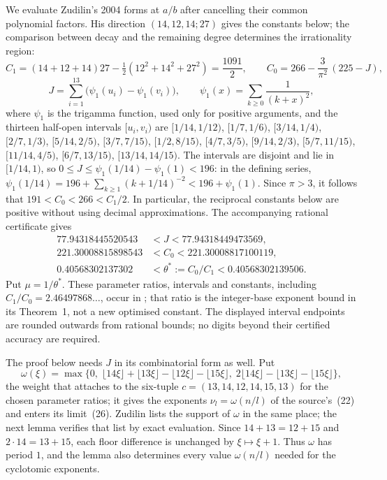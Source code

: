 We evaluate Zudilin's 2004 forms at $a/b$ after cancelling their
common polynomial factors. His direction $(14,12,14;27)$
\cite[Sec.~5, pp.~161--162]{zudilin2004} gives the constants below;
the comparison between decay and the remaining degree determines
the irrationality region:
\[
 C_1=(14+12+14)27-\tfrac12(12^2+14^2+27^2)=\frac{1091}{2},
 \qquad
 C_0=266-\frac{3}{\pi^{2}}\,(225-J),
\]
\[
 J=\sum_{i=1}^{13}\bigl(\psi_1(u_i)-\psi_1(v_i)\bigr),
 \qquad
 \psi_1(x)=\sum_{k\ge0}\frac1{(k+x)^{2}},
\]
where $\psi_1$ is the trigamma function, used only for positive arguments,
and the thirteen half-open intervals $[u_i,v_i)$ are
$[1/14,1/12)$, $[1/7,1/6)$, $[3/14,1/4)$, $[2/7,1/3)$, $[5/14,2/5)$,
$[3/7,7/15)$, $[1/2,8/15)$, $[4/7,3/5)$, $[9/14,2/3)$, $[5/7,11/15)$,
$[11/14,4/5)$, $[6/7,13/15)$, $[13/14,14/15)$.
The intervals are disjoint and lie in $[1/14,1)$, so
$0\le J\le\psi_1(1/14)-\psi_1(1)<196$: in the defining series,
$\psi_1(1/14)=196+\sum_{k\ge1}(k+1/14)^{-2}<196+\psi_1(1)$.
Since $\pi>3$, it follows that $191<C_0<266<C_1/2$.
In particular, the reciprocal constants below are positive without
using decimal approximations. The accompanying rational certificate gives
\[
\begin{aligned}
77.94318445520543&<J<77.94318449473569,\\
221.30008815898543&<C_0<221.30008817100119,\\
0.40568302137302&<\theta^*:=C_0/C_1<0.40568302139506.
\end{aligned}
\]
Put $\mu=1/\theta^*$. These parameter ratios, intervals and constants, including
$C_1/C_0=2.46497868\ldots$, occur in \cite[p.~162]{zudilin2004}; that ratio
is the integer-base exponent bound in its Theorem~1, not a new optimised
constant. The displayed interval endpoints are rounded outwards from
rational bounds; no digits beyond their certified accuracy are required.

The proof below needs $J$ in its combinatorial form as well.  Put
\[
 \omega(\xi)=\max\bigl\{0,\;
 \lfloor14\xi\rfloor+\lfloor13\xi\rfloor-\lfloor12\xi\rfloor-\lfloor15\xi\rfloor,\;
 2\lfloor14\xi\rfloor-\lfloor13\xi\rfloor-\lfloor15\xi\rfloor\bigr\},
\]
the weight that \cite[p.~162]{zudilin2004} attaches to the six-tuple
$c=(13,14,12,14,15,13)$ for the chosen parameter ratios; it gives the exponents
$\nu_l=\omega(n/l)$ of the source's~(22) and enters its limit~(26).  Zudilin
lists the support of $\omega$ in the same place; the next lemma verifies that
list by exact evaluation. Since $14+13=12+15$ and $2\cdot14=13+15$,
each floor difference is unchanged by $\xi\mapsto\xi+1$. Thus $\omega$
has period $1$, and the lemma also determines every value $\omega(n/l)$
needed for the cyclotomic exponents.

